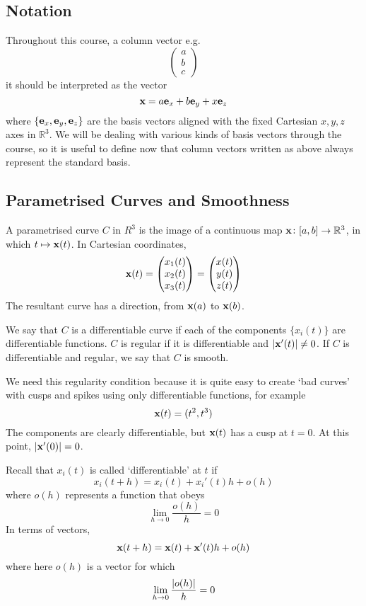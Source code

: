 \subsection{Notation}
Throughout this course, a column vector e.g.
\[
	\begin{pmatrix}
		a \\ b \\ c
	\end{pmatrix}
\]
it should be interpreted as the vector
\[
	\vb x = a \vb e_x + b \vb e_y + x \vb e_z
\]
where \(\{ \vb e_x, \vb e_y, \vb e_z \}\) are the basis vectors aligned with the fixed Cartesian \(x, y, z\) axes in \(\mathbb R^3\).
We will be dealing with various kinds of basis vectors through the course, so it is useful to define now that column vectors written as above always represent the standard basis.

\subsection{Parametrised Curves and Smoothness}
A parametrised curve \(C\) in \(R^3\) is the image of a continuous map \(\vb x \colon [a, b] \to \mathbb R^3\), in which \(t \mapsto \vb x(t)\).
In Cartesian coordinates,
\[
	\vb x(t) = \begin{pmatrix}
		x_1(t) \\ x_2(t) \\ x_3(t)
	\end{pmatrix} = \begin{pmatrix}
		x(t) \\ y(t) \\ z(t)
	\end{pmatrix}
\]
The resultant curve has a direction, from \(\vb x(a)\) to \(\vb x(b)\).
\begin{definition}
	We say that \(C\) is a differentiable curve if each of the components \(\{x_i(t)\}\) are differentiable functions.
	\(C\) is regular if it is differentiable and \(\abs{\vb x'(t)} \neq 0\).
	If \(C\) is differentiable and regular, we say that \(C\) is smooth.
\end{definition}
\begin{note}
	We need this regularity condition because it is quite easy to create `bad curves' with cusps and spikes using only differentiable functions, for example
	\[
		\vb x(t) = (t^2, t^3)
	\]
	The components are clearly differentiable, but \(\vb x(t)\) has a cusp at \(t = 0\).
	At this point, \(\abs{\vb x'(0)} = 0\).
\end{note}
\begin{definition}
	Recall that \(x_i(t)\) is called `differentiable' at \(t\) if
	\[
		x_i(t+h) = x_i(t) + x_i'(t)h + o(h)
	\]
	where \(o(h)\) represents a function that obeys
	\[
		\lim_{h \to 0} \frac{o(h)}{h} = 0
	\]
	In terms of vectors,
	\[
		\vb x(t+h) = \vb x(t) + \vb x'(t)h + o(h)
	\]
	where here \(o(h)\) is a vector for which
	\[
		\lim_{h \to 0} \frac{\abs{o(h)}}{h} = 0
	\]
\end{definition}

